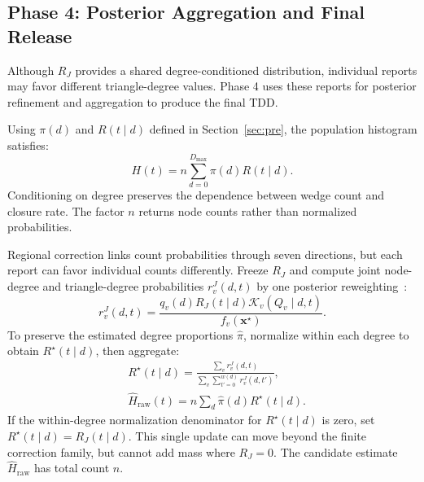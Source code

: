 \subsection{Phase 4: Posterior Aggregation and Final Release}
Although $R_J$ provides a shared degree-conditioned distribution, individual reports may favor different triangle-degree values. 
Phase 4 uses these reports for posterior refinement and aggregation to produce the final TDD.

\label{sec:aggregation}
Using $\pi(d)$ and $R(t\mid d)$ defined in Section~\ref{sec:pre}, the population histogram satisfies:
\begin{equation}
H(t)=n\sum_{d=0}^{D_{\max}}\pi(d)R(t\mid d).
\label{eq:problem-conditional-factorization}
\end{equation}
Conditioning on degree preserves the dependence between wedge count and closure rate. The factor $n$ returns node counts rather than normalized probabilities.

Regional correction links count probabilities through seven directions, but each report can favor individual counts differently. Freeze $R_J$ and compute joint node-degree and triangle-degree probabilities $r_v^J(d,t)$ by one posterior reweighting~\cite{efron2014two}:
\begin{equation}
r_v^J(d,t)=\frac{q_v(d)R_J(t\mid d)\mathcal K_v(Q_v\mid d,t)}
{f_v(\mathbf x^\star)}.
\label{eq:frozen_joint_posterior}
\end{equation}
To preserve the estimated degree proportions $\widehat\pi$, normalize within each degree to obtain $R^\star(t\mid d)$, then aggregate:
\begin{equation}
\begin{aligned}
&R^\star(t\mid d)=\frac{\sum_vr_v^J(d,t)}
{\sum_v\sum_{t'=0}^{w(d)}r_v^J(d,t')},\\
&\widehat H_{\mathrm{raw}}(t)=n\sum_d\widehat\pi(d)R^\star(t\mid d).
\end{aligned}
\label{eq:final_gdd}
\end{equation}
If the within-degree normalization denominator for $R^\star(t\mid d)$ is zero, set $R^\star(t\mid d)=R_J(t\mid d)$. This single update can move beyond the finite correction family, but cannot add mass where $R_J=0$. The candidate estimate $\widehat H_{\mathrm{raw}}$ has total count $n$.

